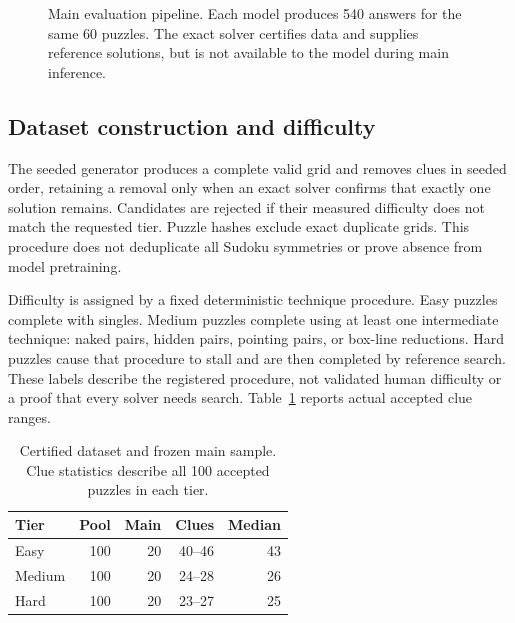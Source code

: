 \documentclass[11pt]{article}
\begin{document}
\begin{figure}[t]
\centering
{}
\caption{Main evaluation pipeline. Each model produces 540 answers for the same 60 puzzles. The exact solver certifies data and supplies reference solutions, but is not available to the model during main inference.}
\label{fig:pipeline}
\end{figure}

\subsection{Dataset construction and difficulty}
The seeded generator produces a complete valid grid and removes clues in seeded order, retaining a removal only when an exact solver confirms that exactly one solution remains. Candidates are rejected if their measured difficulty does not match the requested tier. Puzzle hashes exclude exact duplicate grids. This procedure does not deduplicate all Sudoku symmetries or prove absence from model pretraining.

Difficulty is assigned by a fixed deterministic technique procedure. Easy puzzles complete with singles. Medium puzzles complete using at least one intermediate technique: naked pairs, hidden pairs, pointing pairs, or box-line reductions. Hard puzzles cause that procedure to stall and are then completed by reference search. These labels describe the registered procedure, not validated human difficulty or a proof that every solver needs search. Table~\ref{tab:dataset} reports actual accepted clue ranges.

\begin{table}[t]
\centering\small
\begin{tabular}{lrrrr}
\toprule
Tier & Pool & Main & Clues & Median\\
\midrule
Easy & 100 & 20 & 40--46 & 43\\
Medium & 100 & 20 & 24--28 & 26\\
Hard & 100 & 20 & 23--27 & 25\\
\bottomrule
\end{tabular}
\caption{Certified dataset and frozen main sample. Clue statistics describe all 100 accepted puzzles in each tier.}
\label{tab:dataset}
\end{table}
\end{document}
